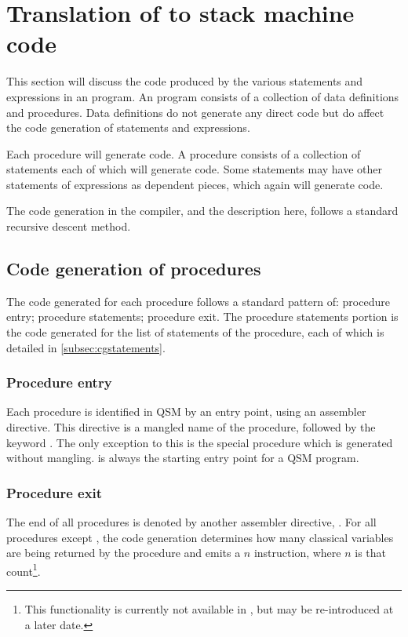 \section{Translation of \lqpl{} to stack machine code}\label{sec:translationtoqsmcode}
This section will discuss the code produced by the 
various statements and expressions in an \lqpl{} program.
An \lqpl{} program consists of
a collection of data definitions and procedures. Data definitions do not
generate any direct code but do affect the code generation of statements
and expressions.

Each procedure will generate code. A procedure consists of a collection of
statements each of which will generate code. Some statements may have other
statements of expressions as dependent pieces, which again will generate 
code.

The code generation in the compiler, and the description here, follows a
standard recursive descent method.
\subsection{Code generation of procedures}\label{subsec:cgprocedures}

The code generated for each procedure follows a standard pattern of: 
procedure entry; procedure statements; procedure exit. The procedure statements 
portion is the code generated for the list of statements of the procedure, each of
which is detailed in \vref{subsec:cgstatements}.

\subsubsection{Procedure entry}
Each procedure is identified in QSM by an entry point, using an assembler directive.
This directive is a mangled name of the procedure, followed by the keyword 
. The only exception to this is the special procedure 
 which is generated without mangling.  is always
the starting entry point for a QSM program.

\subsubsection{Procedure exit}
The end of all procedures is denoted by another assembler directive, 
. For all procedures except , the code generation
determines how many classical variables are being returned by the procedure
and emits a  $n$ instruction, where $n$ is that count\footnote{This
functionality is currently not available in \lqpl{}, but may be re-introduced at
a later date.}.

